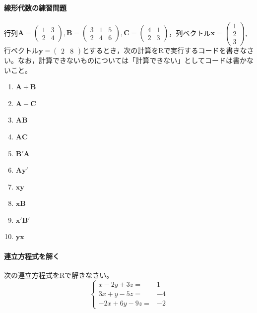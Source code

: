 \paragraph{線形代数の練習問題}行列$\bm{A}=\begin{pmatrix}1 & 3 \\2 & 4\end{pmatrix},\bm{B}=\begin{pmatrix}3&1&5\\2&4&6\end{pmatrix},\bm{C}=\begin{pmatrix}4&1\\2&3\end{pmatrix}$，列ベクトル$\bm{x}=\begin{pmatrix}1\\2\\3\end{pmatrix}$,行ベクトル$\bm{y}=\begin{pmatrix}2&8\end{pmatrix}$とするとき，次の計算をRで実行するコードを書きなさい。なお，計算できないものについては「計算できない」としてコードは書かないこと。
\begin{enumerate}
	\item $\bm{A}+\bm{B}$
	\item $\bm{A}-\bm{C}$
	\item $\bm{AB}$
	\item $\bm{AC}$
	\item $\bm{B}'\bm{A}$
	\item $\bm{A}\bm{y}'$
	\item $\bm{xy}$
	\item $\bm{xB}$
	\item $\bm{x}'\bm{B}'$
	\item $\bm{yx}$
\end{enumerate}

\paragraph{連立方程式を解く}次の連立方程式をRで解きなさい。
\[
	\left\{\begin{array}{rr}x-2 y+3 z= & 1 \\ 3 x+y-5 z= & -4 \\ -2 x+6 y-9 z= & -2\end{array}\right.
\]


